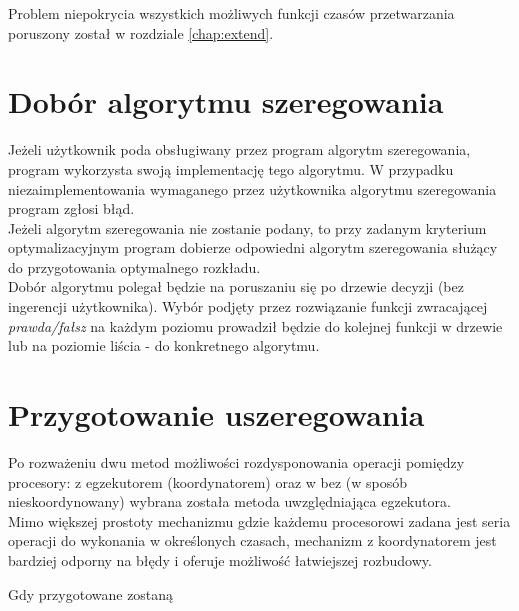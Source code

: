 \documentclass[brudnopis]{xmgr}
\begin{document}
Problem niepokrycia wszystkich możliwych funkcji czasów przetwarzania poruszony został w rozdziale \ref{chap:extend}.


\section{Dobór algorytmu szeregowania}


Jeżeli użytkownik poda obsługiwany przez program algorytm szeregowania, program wykorzysta swoją implementację tego algorytmu.
W przypadku niezaimplementowania wymaganego przez użytkownika algorytmu szeregowania program zgłosi błąd.
\medskip\\

Jeżeli algorytm szeregowania nie zostanie podany, to przy zadanym kryterium optymalizacyjnym program dobierze odpowiedni algorytm szeregowania służący do przygotowania optymalnego rozkładu.
\medskip\\

Dobór algorytmu polegał będzie na poruszaniu się po drzewie decyzji (bez ingerencji użytkownika).
Wybór podjęty przez rozwiązanie funkcji zwracającej \emph{prawda/fałsz} na każdym poziomu prowadził będzie do kolejnej funkcji w drzewie lub na poziomie liścia - do konkretnego algorytmu.

\section{Przygotowanie uszeregowania}

Po rozważeniu dwu metod możliwości rozdysponowania operacji pomiędzy procesory: z egzekutorem (koordynatorem) oraz w bez (w sposób nieskoordynowany) wybrana została metoda uwzględniająca egzekutora.
\medskip\\

Mimo większej prostoty mechanizmu gdzie każdemu procesorowi zadana jest seria operacji do wykonania w określonych czasach, mechanizm z koordynatorem jest bardziej odporny na błędy i oferuje możliwość łatwiejszej rozbudowy.

Gdy przygotowane zostaną
\end{document}
